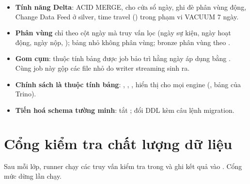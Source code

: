 \begin{itemize}
  \item \textbf{Tính năng Delta}: ACID MERGE,  cho cửa sổ ngày, ghi đè phân vùng động, Change Data Feed ở silver, time travel () trong phạm vi VACUUM 7 ngày.
  \item \textbf{Phân vùng} chỉ theo cột ngày mà truy vấn lọc (ngày sự kiện, ngày hoạt động, ngày nộp, ); bảng nhỏ không phân vùng; bronze phân vùng theo .
  \item \textbf{Gom cụm}: thuộc tính bảng  được job bảo trì hằng ngày áp dụng bằng . Cùng job này gộp các file nhỏ do writer streaming sinh ra.
  \item \textbf{Chính sách là thuộc tính bảng}: , , ,  hiển thị cho mọi engine (, bảng  của Trino).
  \item \textbf{Tiến hoá schema tường minh}: tắt ; đổi DDL kèm câu lệnh migration.
\end{itemize}

\section{Cổng kiểm tra chất lượng dữ liệu}

Sau mỗi lớp, runner chạy các truy vấn kiểm tra trong  và ghi kết quả vào . Cổng mức  dừng lần chạy.

